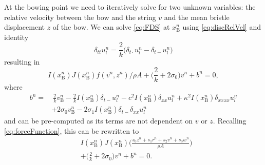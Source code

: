 \documentclass[twoside,a4paper,dvipsnames]{article}
\def\SBcomment[#1]{\textcolor{Red}{#1}}
\def\SWcomment[#1]{\textcolor{Green}{#1}}
\begin{document}
At the bowing point we need to iteratively solve for two unknown variables: the relative velocity between the bow and the string $v$ and the mean bristle displacement $z$ of the bow.
We can solve \eqref{eq:FDS} at $x_\text{B}^n$ using \eqref{eq:discRelVel} and identity \cite{Bilbao2009}
\begin{equation}
    \delta_{tt}u_l^n = \frac{2}{k}\big(\delta_{t\cdot}u_l^n-\delta_{t-}u_l^n\big)
\end{equation}
resulting in 
\begin{equation} \label{eq:incIdentity}
    I(x_\text{B}^n)J(x_\text{B}^n)f(v^n,z^n)/\rho A+\Big(\frac{2}{k}+2\sigma_{0}\Big) v^n+b^n = 0,
\end{equation}
where 
\begin{equation}\label{eq:bn}
        \begin{aligned}b^n =& \: \frac{2}{k}v_\text{B}^n-\frac{2}{k}I(x_\text{B}^n)\delta_{t-}u_l^n - c^2 I(x_\text{B}^n)\delta_{xx} u_l^n +\kappa^2I(x_\text{B}^n)\delta_{xxxx} u_l^n \\
    &+ 2\sigma_0v_\text{B}^n -2\sigma_1I(x_\text{B}^n)\delta_{t-}\delta_{xx}u_l^n
\end{aligned}
\end{equation}
and can be pre-computed as its terms are not dependent on $v$ or $z$. Recalling \eqref{eq:forceFunction}, this can be rewritten to
\begin{equation}\label{eq:newtonFunction}
\begin{aligned}
    &I(x_\text{B}^n)J(x_\text{B}^n)\Bigg(\frac{s_0z^n+s_1r^n+s_2v^n+s_3w^n}{\rho A}
    \Bigg)\\
    &+\Big(\frac{2}{k} + 2\sigma_0 \Big)v^n+ b^n= 0.
    \end{aligned}
\end{equation}
\end{document}
